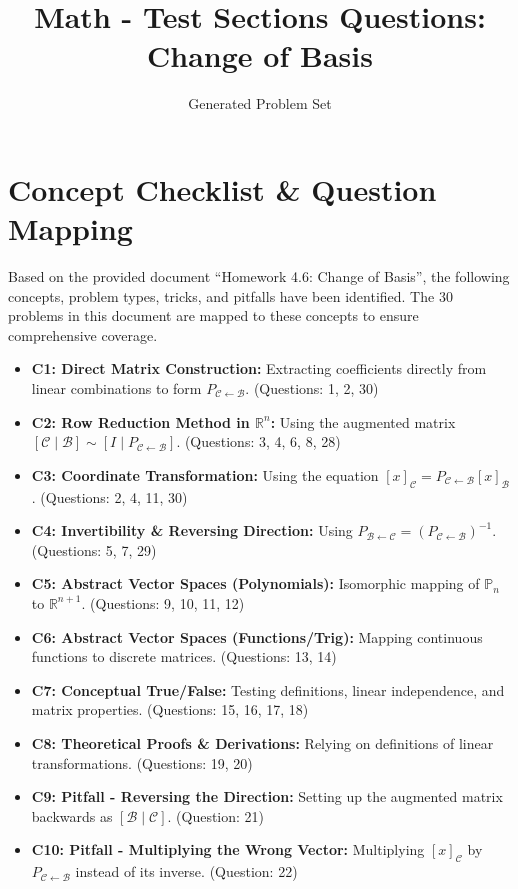 \documentclass[11pt]{article}
\title{Math - Test Sections Questions: Change of Basis}
\author{Generated Problem Set}
\date{}
\begin{document}
\maketitle
\tableofcontents
\newpage

\section{Concept Checklist \& Question Mapping}
Based on the provided document ``Homework 4.6: Change of Basis'', the following concepts, problem types, tricks, and pitfalls have been identified. The 30 problems in this document are mapped to these concepts to ensure comprehensive coverage.

\begin{itemize}
    \item \textbf{C1: Direct Matrix Construction:} Extracting coefficients directly from linear combinations to form $P_{\mathcal{C} \leftarrow \mathcal{B}}$. (Questions: 1, 2, 30)
    \item \textbf{C2: Row Reduction Method in $\mathbb{R}^n$:} Using the augmented matrix $[\mathcal{C} \mid \mathcal{B}] \sim [I \mid P_{\mathcal{C} \leftarrow \mathcal{B}}]$. (Questions: 3, 4, 6, 8, 28)
    \item \textbf{C3: Coordinate Transformation:} Using the equation $[x]_{\mathcal{C}} = P_{\mathcal{C} \leftarrow \mathcal{B}}[x]_{\mathcal{B}}$. (Questions: 2, 4, 11, 30)
    \item \textbf{C4: Invertibility \& Reversing Direction:} Using $P_{\mathcal{B} \leftarrow \mathcal{C}} = (P_{\mathcal{C} \leftarrow \mathcal{B}})^{-1}$. (Questions: 5, 7, 29)
    \item \textbf{C5: Abstract Vector Spaces (Polynomials):} Isomorphic mapping of $\mathbb{P}_n$ to $\mathbb{R}^{n+1}$. (Questions: 9, 10, 11, 12)
    \item \textbf{C6: Abstract Vector Spaces (Functions/Trig):} Mapping continuous functions to discrete matrices. (Questions: 13, 14)
    \item \textbf{C7: Conceptual True/False:} Testing definitions, linear independence, and matrix properties. (Questions: 15, 16, 17, 18)
    \item \textbf{C8: Theoretical Proofs \& Derivations:} Relying on definitions of linear transformations. (Questions: 19, 20)
    \item \textbf{C9: Pitfall - Reversing the Direction:} Setting up the augmented matrix backwards as $[\mathcal{B} \mid \mathcal{C}]$. (Question: 21)
    \item \textbf{C10: Pitfall - Multiplying the Wrong Vector:} Multiplying $[x]_{\mathcal{C}}$ by $P_{\mathcal{C} \leftarrow \mathcal{B}}$ instead of its inverse. (Question: 22)

\end{itemize}
\end{document}
